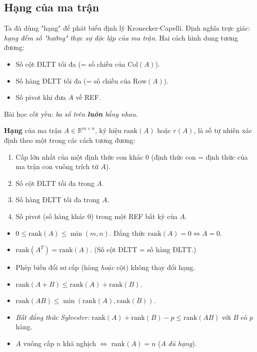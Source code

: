 \documentclass[12pt,a4paper]{article}
\begin{document}
\subsection{Hạng của ma trận}

\begin{dongco}
Ta đã dùng "hạng" để phát biểu định lý Kronecker-Capelli. Định nghĩa trực giác: \emph{hạng đếm số "hướng" thực sự độc lập của ma trận}. Hai cách hình dung tương đương:
\begin{itemize}
  \item Số cột ĐLTT tối đa (= số chiều của $\mathrm{Col}(A)$).
  \item Số hàng ĐLTT tối đa (= số chiều của $\mathrm{Row}(A)$).
  \item Số pivot khi đưa $A$ về REF.
\end{itemize}
Bài học cốt yếu: \emph{ba số trên \textbf{luôn} bằng nhau}.
\end{dongco}

\begin{dinhnghia}
  \textbf{Hạng} của ma trận $A \in \mathbb{R}^{m\times n}$, ký hiệu $\mathrm{rank}(A)$ hoặc $r(A)$, là số tự nhiên xác định theo một trong các cách tương đương:
  \begin{enumerate}
    \item Cấp lớn nhất của một định thức con khác 0 (định thức con = định thức của ma trận con vuông trích từ $A$).
    \item Số cột ĐLTT tối đa trong $A$.
    \item Số hàng ĐLTT tối đa trong $A$.
    \item Số pivot (số hàng khác 0) trong một REF bất kỳ của $A$.
  \end{enumerate}
\end{dinhnghia}

\begin{tinhchat}[title={Tính chất của hạng}]
\begin{itemize}
  \item $0 \le \mathrm{rank}(A) \le \min(m, n)$. Đẳng thức $\mathrm{rank}(A) = 0 \Leftrightarrow A = 0$.
  \item $\mathrm{rank}(A^T) = \mathrm{rank}(A)$. (Số cột ĐLTT = số hàng ĐLTT.)
  \item Phép biến đổi sơ cấp (hàng \emph{hoặc} cột) không thay đổi hạng.
  \item $\mathrm{rank}(A + B) \le \mathrm{rank}(A) + \mathrm{rank}(B)$.
  \item $\mathrm{rank}(AB) \le \min(\mathrm{rank}(A), \mathrm{rank}(B))$.
  \item \emph{Bất đẳng thức Sylvester:} $\mathrm{rank}(A) + \mathrm{rank}(B) - p \le \mathrm{rank}(AB)$ với $B$ có $p$ hàng.
  \item $A$ vuông cấp $n$ khả nghịch $\Leftrightarrow$ $\mathrm{rank}(A) = n$ ($A$ \emph{đủ hạng}).
\end{itemize}
\end{tinhchat}
\end{document}
